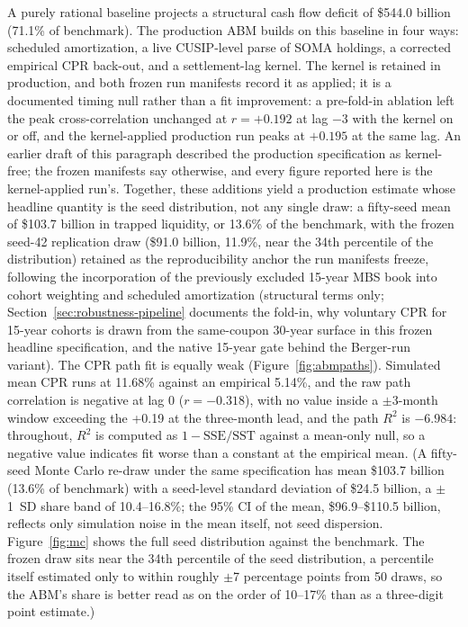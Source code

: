 \documentclass[12pt]{article}
\begin{document}
A purely rational baseline projects a structural cash flow deficit of \$544.0 billion (71.1\% of benchmark). The production ABM builds on this baseline in four ways: scheduled amortization, a live CUSIP-level parse of SOMA holdings, a corrected empirical CPR back-out, and a settlement-lag kernel. The kernel is retained in production, and both frozen run manifests record it as applied; it is a documented timing null rather than a fit improvement: a pre-fold-in ablation left the peak cross-correlation unchanged at $r = +0.192$ at lag $-3$ with the kernel on or off, and the kernel-applied production run peaks at $+0.195$ at the same lag. An earlier draft of this paragraph described the production specification as kernel-free; the frozen manifests say otherwise, and every figure reported here is the kernel-applied run's. Together, these additions yield a production estimate whose headline quantity is the seed distribution, not any single draw: a fifty-seed mean of \$103.7 billion in trapped liquidity, or 13.6\% of the benchmark, with the frozen seed-42 replication draw (\$91.0 billion, 11.9\%, near the 34th percentile of the distribution) retained as the reproducibility anchor the run manifests freeze, following the incorporation of the previously excluded 15-year MBS book into cohort weighting and scheduled amortization (structural terms only; Section~\ref{sec:robustness-pipeline} documents the fold-in, why voluntary CPR for 15-year cohorts is drawn from the same-coupon 30-year surface in this frozen headline specification, and the native 15-year gate behind the Berger-run variant). The CPR path fit is equally weak (Figure~\ref{fig:abmpaths}). Simulated mean CPR runs at 11.68\% against an empirical 5.14\%, and the raw path correlation is negative at lag 0 ($r = -0.318$), with no value inside a $\pm$3-month window exceeding the +0.19 at the three-month lead, and the path $R^2$ is $-6.984$: throughout, $R^2$ is computed as $1-\mathrm{SSE}/\mathrm{SST}$ against a mean-only null, so a negative value indicates fit worse than a constant at the empirical mean. (A fifty-seed Monte Carlo re-draw under the same specification has mean \$103.7 billion (13.6\% of benchmark) with a seed-level standard deviation of \$24.5 billion, a $\pm$1~SD share band of 10.4--16.8\%; the 95\% CI of the mean, \$96.9--\$110.5 billion, reflects only simulation noise in the mean itself, not seed dispersion. Figure~\ref{fig:mc} shows the full seed distribution against the benchmark. The frozen draw sits near the 34th percentile of the seed distribution, a percentile itself estimated only to within roughly $\pm$7 percentage points from 50 draws, so the ABM's share is better read as on the order of 10--17\% than as a three-digit point estimate.)
\end{document}
